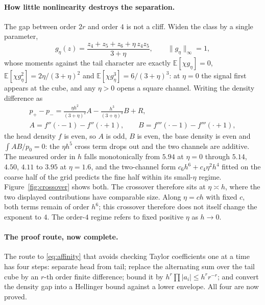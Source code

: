 \paragraph{How little nonlinearity destroys the separation.}
The gap between order $2r$ and order $4$ is not a cliff. Widen the class by a single
parameter,
\[
g_{\eta}(z)=\frac{z_{4}+z_{5}+z_{6}+\eta\,z_{4}z_{5}}{3+\eta},
\qquad\|g_{\eta}\|_{\infty}=1,
\]
whose moments against the tail character are exactly
$\mathbb{E}[\chi g_{\eta}]=0$, $\mathbb{E}[\chi g_{\eta}^{2}]=2\eta/(3+\eta)^{2}$ and
$\mathbb{E}[\chi g_{\eta}^{3}]=6/(3+\eta)^{3}$: at $\eta=0$ the signal first appears at the
cube, and any $\eta>0$ opens a square channel. Writing the density difference as
\begin{gather*}
p_{+}-p_{-}=\frac{\eta h^{2}}{(3+\eta)^{2}}A-\frac{h^{3}}{(3+\eta)^{3}}B+R,\\
A=f''(\cdot-1)-f''(\cdot+1),\qquad
B=f'''(\cdot-1)-f'''(\cdot+1),
\end{gather*}
the head density $f$ is even, so $A$ is odd, $B$ is even, the base density is even and
$\int AB/p_{0}=0$: the $\eta h^{5}$ cross term drops out and the two channels are
additive. The measured order in $h$ falls monotonically from $5.94$ at $\eta=0$ through
$5.14$, $4.50$, $4.11$ to $3.95$ at $\eta=1.6$, and the two-channel form
$c_{6}h^{6}+c_{4}\eta^{2}h^{4}$ fitted on the coarse half of the grid predicts the fine
half within its small-$\eta$ regime. Figure~\ref{fig:crossover} shows both. The crossover therefore sits at
$\eta\asymp h$, where the two displayed contributions have comparable size.
Along $\eta=ch$ with fixed $c$, both terms remain of order $h^{6}$; this crossover
therefore does not itself change the exponent to $4$. The order-$4$ regime refers
to fixed positive $\eta$ as $h\to0$. \NUM{}


\paragraph{The proof route, now complete.}
The route to \eqref{eq:affinity} that avoids checking Taylor coefficients one at a time has
four steps: separate head from tail; replace the alternating sum over the tail cube by an
$r$-th order finite difference; bound it by $h^{r}\prod|a_{i}|\le h^{r}r^{-r}$; and convert
the density gap into a Hellinger bound against a lower envelope. All four are now proved.

